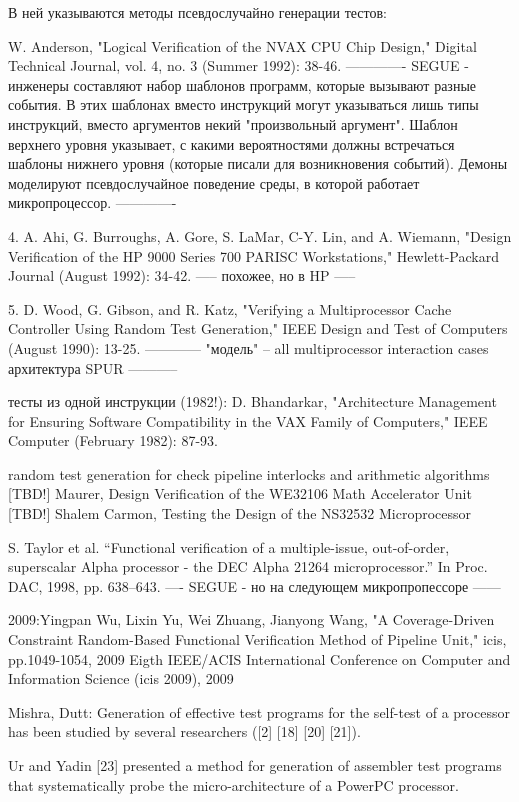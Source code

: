 \documentclass[14pt]{extreport}
\begin{document}
В ней указываются методы псевдослучайно генерации тестов:

W. Anderson, "Logical Verification of the NVAX CPU Chip
Design," Digital Technical Journal, vol. 4, no. 3 (Summer 1992):
38-46.
-------------
SEGUE - инженеры составляют набор шаблонов программ, которые вызывают разные события. В этих шаблонах вместо инструкций могут указываться лишь типы инструкций, вместо аргументов некий "произвольный аргумент".
Шаблон верхнего уровня указывает, с какими вероятностями должны встречаться шаблоны нижнего уровня (которые писали для возникновения событий).
Демоны моделируют псевдослучайное поведение среды, в которой работает микропроцессор.
-------------

4. A. Ahi, G. Burroughs, A. Gore, S. LaMar, C-Y. Lin, and A.
Wiemann, "Design Verification of the HP 9000 Series 700 PARISC
Workstations," Hewlett-Packard Journal (August 1992):
34-42.
-----
похожее, но в HP
-----

5. D. Wood, G. Gibson, and R. Katz, "Verifying a Multiprocessor Cache Controller Using Random Test Generation," IEEE Design and Test of Computers (August 1990): 13-25.
------------
"модель" -- all multiprocessor interaction cases
архитектура SPUR
-----------

тесты из одной инструкции (1982!):
D. Bhandarkar, "Architecture Management for Ensuring Software Compatibility in the VAX Family of Computers," IEEE Computer (February 1982): 87-93.

random test generation for check pipeline interlocks and arithmetic algorithms
[TBD!] Maurer, Design Verification of the WE32106 Math Accelerator Unit
[TBD!] Shalem Carmon, Testing the Design of the NS32532 Microprocessor

S. Taylor et al. “Functional verification of a multiple-issue, out-of-order, superscalar Alpha processor - the DEC Alpha 21264 microprocessor.” In Proc. DAC, 1998, pp. 638–643.
----
SEGUE - но на следующем микропропессоре
------

2009:Yingpan Wu, Lixin Yu, Wei Zhuang, Jianyong Wang, "A Coverage-Driven Constraint Random-Based Functional Verification Method of Pipeline Unit," icis, pp.1049-1054, 2009 Eigth IEEE/ACIS International Conference on Computer and Information Science (icis 2009), 2009


Mishra, Dutt:
Generation of effective test programs for the self-test of a processor has been studied by several researchers ([2] [18] [20] [21]).

Ur and Yadin [23] presented a method for generation of assembler test programs that systematically probe the micro-architecture of a PowerPC processor.
\end{document}
